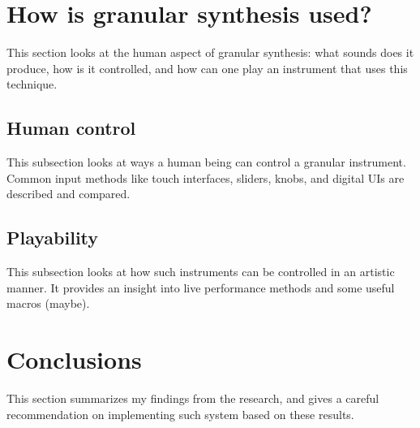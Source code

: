 \documentclass[12pt, IEEEtran]{article}
\begin{document}
\section{How is granular synthesis used?}
This section looks at the human aspect of granular synthesis: what sounds does it produce, how is it controlled, and how can one play an instrument that uses this technique.

\subsection{Human control}
This subsection looks at ways a human being can control a granular instrument. Common input methods like touch interfaces, sliders, knobs, and digital UIs are described and compared.

\subsection{Playability}
This subsection looks at how such instruments can be controlled in an artistic manner. It provides an insight into live performance methods and some useful macros (maybe).

\section*{Conclusions}
This section summarizes my findings from the research, and gives a careful recommendation on implementing such system based on these results.
\end{document}
